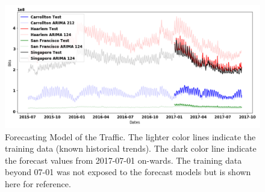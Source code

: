 \begin{figure}[!h]
  \centering
  \includegraphics[scale=0.17]{img/_arima.png}
  \caption[ARIMA for BEM]{Forecasting Model of the Traffic. The lighter color lines indicate the training data (known historical trends). The dark color line indicate the forecast values from 2017-07-01 on-wards. The training data beyond 07-01 was not exposed to the forecast models but is shown here for reference. }
  \label{fig:arima_bem}
  \end{figure}
